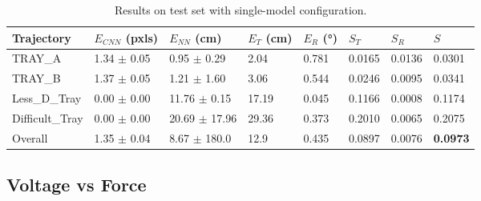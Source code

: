 \begin{table}[H]
\label{tab:single-model test results}
\centering
\begin{tabular}{l | l l l l | l l | l}
\toprule
Trajectory & $E_{CNN}$ (pxls) & $E_{NN}$ (cm) & $E_T$ (cm)& $E_R$ (°)& $S_T$ & $S_R$ & $S$\\
\midrule
TRAY\_A & 1.34 $\pm$ 0.05 & 0.95 $\pm$ 0.29 & 2.04 & 0.781 & 0.0165 & 0.0136 & 0.0301\\
TRAY\_B & 1.37 $\pm$ 0.05 & 1.21 $\pm$ 1.60 & 3.06 & 0.544 & 0.0246 & 0.0095 & 0.0341\\
Less\_D\_Tray & 0.00 $\pm$ 0.00 & 11.76 $\pm$ 0.15 & 17.19 & 0.045 & 0.1166 & 0.0008 & 0.1174\\
Difficult\_Tray & 0.00 $\pm$ 0.00 & 20.69 $\pm$ 17.96 & 29.36 & 0.373 & 0.2010 & 0.0065 & 0.2075\\
\midrule
Overall & 1.35 $\pm$ 0.04 & 8.67 $\pm$ 180.0 & 12.9 & 0.435 & 0.0897 & 0.0076 & \textbf{0.0973}\\
\bottomrule
\end{tabular}
\caption{Results on test set with single-model configuration.}
\end{table}


\subsection{Voltage vs Force}